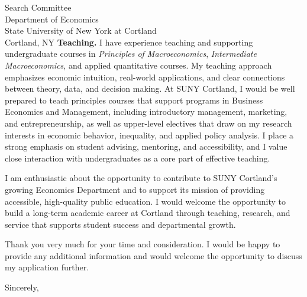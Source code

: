 \documentclass[11pt,letterpaper]{letter}
\begin{document}
\begin{letter}{Search Committee \\
Department of Economics \\
State University of New York at Cortland \\
Cortland, NY}
\textbf{Teaching.} I have experience teaching and supporting undergraduate courses in \textit{Principles of Macroeconomics}, \textit{Intermediate Macroeconomics}, and applied quantitative courses. My teaching approach emphasizes economic intuition, real-world applications, and clear connections between theory, data, and decision making. At SUNY Cortland, I would be well prepared to teach principles courses that support programs in Business Economics and Management, including introductory management, marketing, and entrepreneurship, as well as upper-level electives that draw on my research interests in economic behavior, inequality, and applied policy analysis. I place a strong emphasis on student advising, mentoring, and accessibility, and I value close interaction with undergraduates as a core part of effective teaching.

I am enthusiastic about the opportunity to contribute to SUNY Cortland’s growing Economics Department and to support its mission of providing accessible, high-quality public education. I would welcome the opportunity to build a long-term academic career at Cortland through teaching, research, and service that supports student success and departmental growth.

Thank you very much for your time and consideration. I would be happy to provide any additional information and would welcome the opportunity to discuss my application further.

\closing{Sincerely,}

\end{letter}
\end{document}
